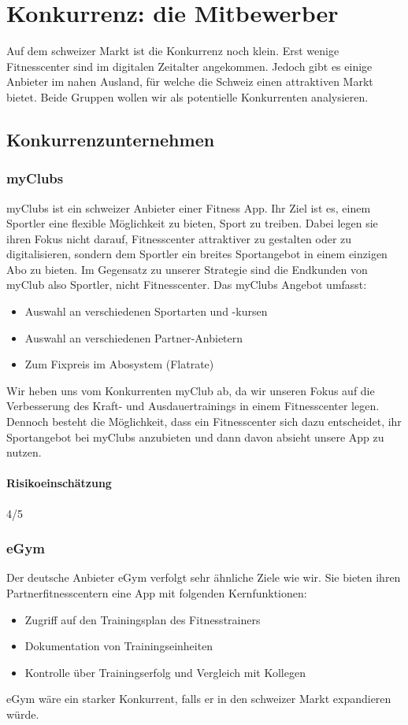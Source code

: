 \clearpage
\section{Konkurrenz: die Mitbewerber}\label{sec:konkurrenz-die-mitbewerber}

Auf dem schweizer Markt ist die Konkurrenz noch klein. Erst wenige Fitnesscenter sind im digitalen Zeitalter angekommen. Jedoch gibt es einige Anbieter im nahen Ausland, für welche die Schweiz einen attraktiven Markt bietet. Beide Gruppen wollen wir als potentielle Konkurrenten analysieren.
\subsection{Konkurrenzunternehmen}
\subsubsection{myClubs}
myClubs\cite{myclubs} ist ein schweizer Anbieter einer Fitness App. Ihr Ziel ist es, einem Sportler eine flexible Möglichkeit zu bieten, Sport zu treiben. Dabei legen sie ihren Fokus nicht darauf, Fitnesscenter attraktiver zu gestalten oder zu digitalisieren, sondern dem Sportler ein breites Sportangebot in einem einzigen Abo zu bieten. Im Gegensatz zu unserer Strategie sind die Endkunden von myClub also Sportler, nicht Fitnesscenter.
Das myClubs Angebot umfasst:
\begin{itemize}
	\item Auswahl an verschiedenen Sportarten und -kursen
	\item Auswahl an verschiedenen Partner-Anbietern
	\item Zum Fixpreis im Abosystem (Flatrate)
\end{itemize}
Wir heben uns vom Konkurrenten myClub ab, da wir unseren Fokus auf die Verbesserung des Kraft- und Ausdauertrainings in einem Fitnesscenter legen. Dennoch besteht die Möglichkeit, dass ein Fitnesscenter sich dazu entscheidet, ihr Sportangebot bei myClubs anzubieten und dann davon absieht unsere App zu nutzen.
\paragraph{Risikoeinschätzung} \qquad {} 4/5
\subsubsection{eGym}
Der deutsche Anbieter eGym\cite{egym} verfolgt sehr ähnliche Ziele wie wir. Sie bieten ihren Partnerfitnesscentern eine App mit folgenden Kernfunktionen:
\begin{itemize}
	\item Zugriff auf den Trainingsplan des Fitnesstrainers
	\item Dokumentation von Trainingseinheiten
	\item Kontrolle über Trainingserfolg und Vergleich mit Kollegen
\end{itemize}
eGym wäre ein starker Konkurrent, falls er in den schweizer Markt expandieren würde.
